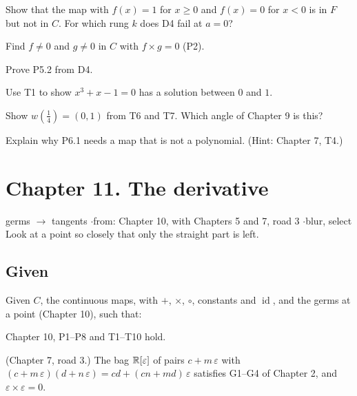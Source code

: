 \begin{lines}
\item[\lab{E1}] Show that the map with $f(x) = 1$ for $x \ge 0$ and $f(x) = 0$ for $x < 0$ is in $F$ but not in $C$. For which rung $k$ does D4 fail at $a = 0$?
\item[\lab{E2}] Find $f \neq 0$ and $g \neq 0$ in $C$ with $f \times g = 0$ (P2).
\item[\lab{E3}] Prove P5.2 from D4.
\item[\lab{E4}] Use T1 to show $x^3 + x - 1 = 0$ has a solution between $0$ and $1$.
\item[\lab{E5}] Show $w(\tfrac14) = (0, 1)$ from T6 and T7. Which angle of Chapter 9 is this?
\item[\lab{E6}] Explain why P6.1 needs a map that is not a polynomial. (Hint: Chapter 7, T4.)
\end{lines}

\newpage

\section*{Chapter 11. The derivative}
\begin{center}
{\normalsize germs $\to$ tangents \quad$\cdot$\quad from: Chapter 10, with Chapters 5 and 7, road 3 \quad$\cdot$\quad blur, select}\\[4pt]
{\small Look at a point so closely that only the straight part is left.}
\end{center}

\subsection*{Given}

Given $C$, the continuous maps, with $+$, $\times$, $\circ$, constants and $\operatorname{id}$, and the germs at a point (Chapter 10), such that:
\begin{lines}
\item[\lab{G1}] Chapter 10, P1--P8 and T1--T10 hold.
\item[\lab{G2}] (Chapter 7, road 3.) The bag $\mathbb{R}[\varepsilon]$ of pairs $c + m\,\varepsilon$ with $(c + m\,\varepsilon)(d + n\,\varepsilon) = cd + (cn + md)\,\varepsilon$ satisfies G1--G4 of Chapter 2, and $\varepsilon \times \varepsilon = 0$.
\end{lines}

